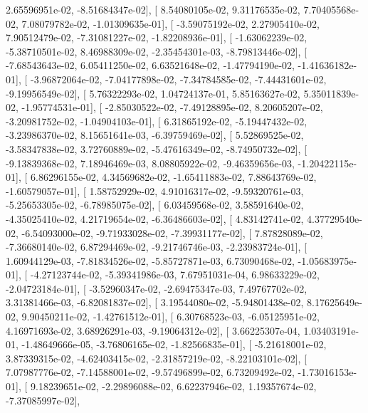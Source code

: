 \documentclass{article}
\begin{document}
          2.65596951e-02,  -8.51684347e-02],
       [  8.54080105e-02,   9.31176535e-02,   7.70405568e-02,
          7.08079782e-02,  -1.01309635e-01],
       [ -3.59075192e-02,   2.27905410e-02,   7.90512479e-02,
         -7.31081227e-02,  -1.82208936e-01],
       [ -1.63062239e-02,  -5.38710501e-02,   8.46988309e-02,
         -2.35454301e-03,  -8.79813446e-02],
       [ -7.68543643e-02,   6.05411250e-02,   6.63521648e-02,
         -1.47794190e-02,  -1.41636182e-01],
       [ -3.96872064e-02,  -7.04177898e-02,  -7.34784585e-02,
         -7.44431601e-02,  -9.19956549e-02],
       [  5.76322293e-02,   1.04724137e-01,   5.85163627e-02,
          5.35011839e-02,  -1.95774531e-01],
       [ -2.85030522e-02,  -7.49128895e-02,   8.20605207e-02,
         -3.20981752e-02,  -1.04904103e-01],
       [  6.31865192e-02,  -5.19447432e-02,  -3.23986370e-02,
          8.15651641e-03,  -6.39759469e-02],
       [  5.52869525e-02,  -3.58347838e-02,   3.72760889e-02,
         -5.47616349e-02,  -8.74950732e-02],
       [ -9.13839368e-02,   7.18946469e-03,   8.08805922e-02,
         -9.46359656e-03,  -1.20422115e-01],
       [  6.86296155e-02,   4.34569682e-02,  -1.65411883e-02,
          7.88643769e-02,  -1.60579057e-01],
       [  1.58752929e-02,   4.91016317e-02,  -9.59320761e-03,
         -5.25653305e-02,  -6.78985075e-02],
       [  6.03459568e-02,   3.58591640e-02,  -4.35025410e-02,
          4.21719654e-02,  -6.36486603e-02],
       [  4.83142741e-02,   4.37729540e-02,  -6.54093000e-02,
         -9.71933028e-02,  -7.39931177e-02],
       [  7.87828089e-02,  -7.36680140e-02,   6.87294469e-02,
         -9.21746746e-03,  -2.23983724e-01],
       [  1.60944129e-03,  -7.81834526e-02,  -5.85727871e-03,
          6.73090468e-02,  -1.05683975e-01],
       [ -4.27123744e-02,  -5.39341986e-03,   7.67951031e-04,
          6.98633229e-02,  -2.04723184e-01],
       [ -3.52960347e-02,  -2.69475347e-03,   7.49767702e-02,
          3.31381466e-03,  -6.82081837e-02],
       [  3.19544080e-02,  -5.94801438e-02,   8.17625649e-02,
          9.90450211e-02,  -1.42761512e-01],
       [  6.30768523e-03,  -6.05125951e-02,   4.16971693e-02,
          3.68926291e-03,  -9.19064312e-02],
       [  3.66225307e-04,   1.03403191e-01,  -1.48649666e-05,
         -3.76806165e-02,  -1.82566835e-01],
       [ -5.21618001e-02,   3.87339315e-02,  -4.62403415e-02,
         -2.31857219e-02,  -8.22103101e-02],
       [  7.07987776e-02,  -7.14588001e-02,  -9.57496899e-02,
          6.73209492e-02,  -1.73016153e-01],
       [  9.18239651e-02,  -2.29896088e-02,   6.62237946e-02,
          1.19357674e-02,  -7.37085997e-02],
\end{document}
